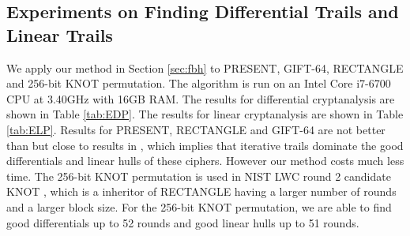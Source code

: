 
%
%
%

\subsection{Experiments on Finding Differential Trails and Linear Trails}

We apply our method in Section \ref{sec:fbh} to PRESENT, GIFT-64, RECTANGLE and 256-bit KNOT permutation. The algorithm is run on an Intel Core i7-6700 CPU at 3.40GHz with 16GB RAM. The results for differential cryptanalysis are shown in Table \ref{tab:EDP}. The results for linear cryptanalysis are shown in Table \ref{tab:ELP}. Results for PRESENT, RECTANGLE and GIFT-64 are not better than but close to results in \cite{HV18}, which implies that iterative trails dominate the good differentials and linear hulls of these ciphers. However our method costs much less time. The 256-bit KNOT permutation is used in NIST LWC round 2 candidate KNOT \cite{ZDY19}, which is a inheritor of RECTANGLE having a larger number of rounds and a larger block size. For the 256-bit KNOT permutation, we are able to find good differentials up to 52 rounds and good linear hulls up to 51 rounds. 

